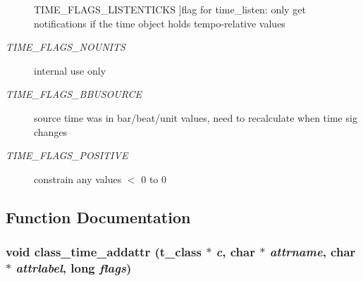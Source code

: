 \begin{Desc}
\begin{description}
{\hypertarget{group__time_gga99fb83031ce9923c84392b4e92f956b5a22fec8e51f11f945f8b94279a6df37df}{
TIME\_\-FLAGS\_\-LISTENTICKS}
\label{group__time_gga99fb83031ce9923c84392b4e92f956b5a22fec8e51f11f945f8b94279a6df37df}
}]flag for time\_\-listen: only get notifications if the time object holds tempo-\/relative values \item[{\em 
\hypertarget{group__time_gga99fb83031ce9923c84392b4e92f956b5a5f103c6561c69e7759621cd216d0176b}{
TIME\_\-FLAGS\_\-NOUNITS}
\label{group__time_gga99fb83031ce9923c84392b4e92f956b5a5f103c6561c69e7759621cd216d0176b}
}]internal use only \item[{\em 
\hypertarget{group__time_gga99fb83031ce9923c84392b4e92f956b5a4dc0bf02a08234ce8b66e8ecb5ec568e}{
TIME\_\-FLAGS\_\-BBUSOURCE}
\label{group__time_gga99fb83031ce9923c84392b4e92f956b5a4dc0bf02a08234ce8b66e8ecb5ec568e}
}]source time was in bar/beat/unit values, need to recalculate when time sig changes \item[{\em 
\hypertarget{group__time_gga99fb83031ce9923c84392b4e92f956b5a4d4396aa4c56efec83245821ea888235}{
TIME\_\-FLAGS\_\-POSITIVE}
\label{group__time_gga99fb83031ce9923c84392b4e92f956b5a4d4396aa4c56efec83245821ea888235}
}]constrain any values $<$ 0 to 0 \end{description}
\end{Desc}



\subsection{Function Documentation}
\hypertarget{group__time_ga95e5b2330715823c8a609ccd500aa361}{
\subsubsection[{class\_\-time\_\-addattr}]{\setlength{\rightskip}{0pt plus 5cm}void class\_\-time\_\-addattr ({\bf t\_\-class} $\ast$ {\em c}, \/  char $\ast$ {\em attrname}, \/  char $\ast$ {\em attrlabel}, \/  long {\em flags})}}
\label{group__time_ga95e5b2330715823c8a609ccd500aa361}


